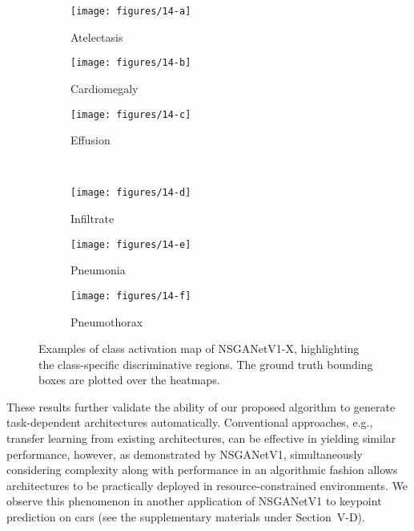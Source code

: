 \documentclass[journal]{IEEEtran}
\def\ourmethod{NSGANetV1}
\theoremstyle{definition}
\theoremstyle{remark}
\begin{document}
\begin{figure}[t]
	\centering
	\begin{subfigure}[t]{.15\textwidth}
		\centering
		\texttt{[image: figures/14-a]}
		\caption{Atelectasis\label{fig:Atelectasis}}
	\end{subfigure}
	\begin{subfigure}[t]{.15\textwidth}
		\centering
		\texttt{[image: figures/14-b]}
		\caption{Cardiomegaly\label{fig:Cardiomegaly}}
	\end{subfigure}
	\begin{subfigure}[t]{.15\textwidth}
		\centering
		\texttt{[image: figures/14-c]}
		\caption{Effusion\label{fig:Effusion}}
	\end{subfigure}\\
	\begin{subfigure}[t]{.15\textwidth}
		\centering
		\texttt{[image: figures/14-d]}
		\caption{Infiltrate\label{fig:Infiltrate}}
	\end{subfigure}
	\begin{subfigure}[t]{.15\textwidth}
		\centering
		\texttt{[image: figures/14-e]}
		\caption{Pneumonia\label{fig:Pneumonia}}
	\end{subfigure}
	\begin{subfigure}[t]{.15\textwidth}
		\centering
		\texttt{[image: figures/14-f]}
		\caption{Pneumothorax\label{fig:Pneumothorax}}
	\end{subfigure}
	\caption{Examples of class activation map \cite{zhou2016learning} of \ourmethod{}-X, highlighting the class-specific discriminative regions. The ground truth bounding boxes are plotted over the heatmaps.
	\label{fig:x_ray_heatmaps}\vspace{-0.3cm}}
\end{figure}

These results further validate the ability of our proposed algorithm to generate task-dependent architectures automatically. Conventional approaches, e.g., transfer learning from existing architectures, can be effective in yielding similar performance, however, as demonstrated by \ourmethod{}, simultaneously considering complexity along with performance in an algorithmic fashion allows architectures to be practically deployed in resource-constrained environments. {We observe this phenomenon in another application of \ourmethod{} to keypoint prediction on cars (see the supplementary materials under Section~V-D).}
\end{document}
